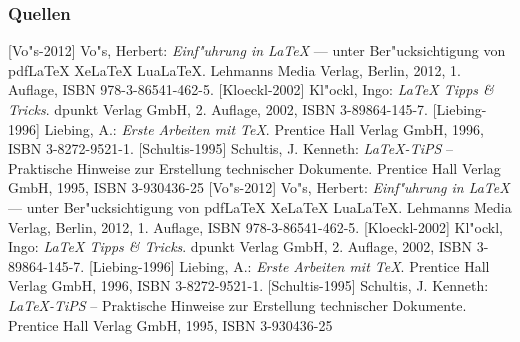 \documentclass{beamer}
\begin{document}
\begin{frame}[allowframebreaks]	%
 \frametitle{Quellen}
	\begin{thebibliography}{Sommerville-2001}
		[Vo"s-2012]
			Vo"s, Herbert: \textit{Einf"uhrung in \LaTeX} ---
				unter Ber"ucksichtigung von pdfLaTeX XeLaTeX LuaLaTeX.
			Lehmanns Media Verlag, Berlin, 2012, 1. Auflage, ISBN 978-3-86541-462-5.
		[Kloeckl-2002]
			Kl"ockl, Ingo: \textit{LaTeX Tipps \& Tricks}.
			dpunkt Verlag GmbH, 2. Auflage, 2002, ISBN 3-89864-145-7.
		[Liebing-1996]
			Liebing, A.: \textit{Erste Arbeiten mit TeX}.
			Prentice Hall Verlag GmbH, 1996, ISBN 3-8272-9521-1.
		[Schultis-1995]
			Schultis, J. Kenneth: \textit{LaTeX-TiPS} -- Praktische Hinweise zur Erstellung technischer Dokumente.
			Prentice Hall Verlag GmbH, 1995, ISBN 3-930436-25
		[Vo"s-2012]
			Vo"s, Herbert: \textit{Einf"uhrung in \LaTeX} ---
				unter Ber"ucksichtigung von pdfLaTeX XeLaTeX LuaLaTeX.
			Lehmanns Media Verlag, Berlin, 2012, 1. Auflage, ISBN 978-3-86541-462-5.
		[Kloeckl-2002]
			Kl"ockl, Ingo: \textit{LaTeX Tipps \& Tricks}.
			dpunkt Verlag GmbH, 2. Auflage, 2002, ISBN 3-89864-145-7.
		[Liebing-1996]
			Liebing, A.: \textit{Erste Arbeiten mit TeX}.
			Prentice Hall Verlag GmbH, 1996, ISBN 3-8272-9521-1.
		[Schultis-1995]
			Schultis, J. Kenneth: \textit{LaTeX-TiPS} -- Praktische Hinweise zur Erstellung technischer Dokumente.
			Prentice Hall Verlag GmbH, 1995, ISBN 3-930436-25
\end{thebibliography}
\end{frame}
\end{document}
